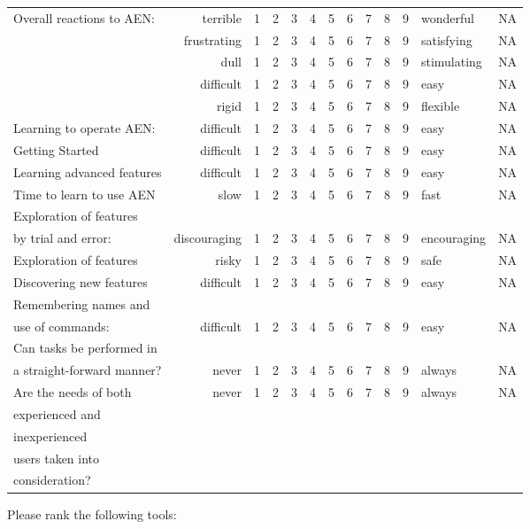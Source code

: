 \begin{tabular}{lrccccccccclc}\\
\hline
Overall reactions to AEN:&terrible&1 &2 &3 &4 &5 &6 &7 &8 &9 &wonderful&NA\\
&frustrating&1 &2 &3 &4 &5 &6 &7 &8 &9 &satisfying&NA\\
&dull&1 &2 &3 &4 &5 &6 &7 &8 &9 &stimulating&NA\\
&difficult&1 &2 &3 &4 &5 &6 &7 &8 &9 &easy&NA\\
&rigid&1 &2 &3 &4 &5 &6 &7 &8 &9 &flexible&NA\\
\hline
Learning to operate AEN:&difficult&1 &2 &3 &4 &5 &6 &7 &8 &9 &easy&NA\\
\hline
Getting Started&difficult&1 &2 &3 &4 &5 &6 &7 &8 &9 &easy&NA\\
\hline
Learning advanced features&difficult&1 &2 &3 &4 &5 &6 &7 &8 &9 &easy&NA\\
\hline
Time to learn to use AEN&slow&1 &2 &3 &4 &5 &6 &7 &8 &9 &fast&NA\\
\hline
Exploration of features\\
 by trial and error:&discouraging&1 &2 &3 &4 &5 &6 &7 &8 &9 &encouraging&NA\\
\hline
Exploration of features&risky&1 &2 &3 &4 &5 &6 &7 &8 &9 &safe&NA\\
\hline
Discovering new features&difficult&1 &2 &3 &4 &5 &6 &7 &8 &9 &easy&NA\\
\hline
Remembering names and\\
 use of commands:&difficult&1 &2 &3 &4 &5 &6 &7 &8 &9 &easy&NA\\
\hline
Can tasks be performed in\\
 a straight-forward manner?&never&1 &2 &3 &4 &5 &6 &7 &8 &9 &always&NA\\
\hline
Are the needs of both&never&1 &2 &3 &4 &5 &6 &7 &8 &9 &always&NA\\
 experienced and\\
 inexperienced\\
 users taken into\\
 consideration?
\end{tabular}
\newpage
Please rank the following tools:

